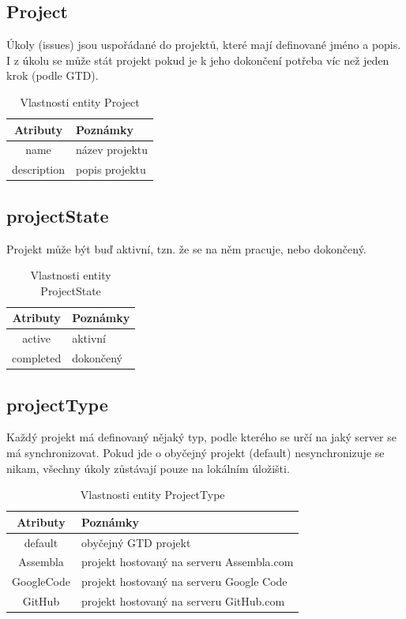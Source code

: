 \subsection{Project}
Úkoly (issues) jsou uspořádané do projektů, které mají definované jméno a popis. I z úkolu se může stát projekt pokud je k jeho dokončení potřeba víc než jeden krok (podle GTD).

\begin{table}
\begin{center}
	\begin{tabular}{|c|l|}
	\hline
	Atributy & Poznámky \\
	\hline
	name & název projektu \\
	description & popis projektu \\
	\hline
	\end{tabular}
\end{center}
\caption{Vlastnosti entity Project}
\label{tab:project}
\end{table}

\subsection{projectState}
Projekt může být buď aktivní, tzn. že se na něm pracuje, nebo dokončený.

\begin{table}
\begin{center}
	\begin{tabular}{|c|l|}
	\hline
	Atributy & Poznámky \\
	\hline
	active & aktivní \\
	completed & dokončený \\
	\hline
	\end{tabular}
\end{center}
\caption{Vlastnosti entity ProjectState}
\label{tab:projectState}
\end{table}

\subsection{projectType}

Každý projekt má definovaný nějaký typ, podle kterého se určí na jaký server se má synchronizovat. Pokud jde o obyčejný projekt (default) nesynchronizuje se nikam, všechny úkoly zůstávají pouze na lokálním úložišti.

\begin{table}
\begin{center}
	\begin{tabular}{|c|l|}
	\hline
	Atributy & Poznámky \\
	\hline
	default & obyčejný GTD projekt \\
	Assembla & projekt hostovaný na serveru Assembla.com \\
	GoogleCode & projekt hostovaný na serveru Google Code \\
	GitHub & projekt hostovaný na serveru GitHub.com \\
	\hline
	\end{tabular}
\end{center}
\caption{Vlastnosti entity ProjectType}
\label{tab:projectType}
\end{table}

